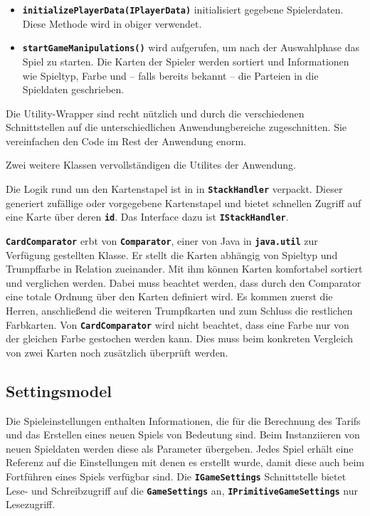 \documentclass[
							a4paper, 
							11pt, 
							openany, 
							liststotoc,
							parskip=half, 
   							headings=normal
						]{scrreprt}
\begin{document}
{\begin{itemize}
ini\-tia\-li\-siert die Spieldaten für das nächste Spiel. Die gegebene Spielerposition wird der erste Spieler des Spiels. Der optionale Parameter kann verwendet werden, um das Spiel mit einem vordefinierten Kartenstapel zu initialisieren. Ist dieser nicht gesetzt so wird ein neuer, gemischter Stapel verwendet.
	\item \textbf{\texttt{initializePlayerData(IPlayerData)}} initialisiert gegebene Spielerdaten. Diese Methode wird in obiger verwendet.
	\item \textbf{\texttt{startGameManipulations()}} wird aufgerufen, um nach der Auswahlphase das Spiel zu starten. Die Karten der Spieler werden sortiert und Informationen wie Spieltyp, Farbe und -- falls bereits bekannt -- die Parteien in die Spieldaten geschrieben.
\end{itemize}\bigskip

Die Utility-Wrapper sind recht nützlich und durch die verschiedenen Schnittstellen auf die unterschiedlichen Anwendungbereiche zugeschnitten. Sie vereinfachen den Code im Rest der Anwendung enorm.\bigskip

Zwei weitere Klassen vervollständigen die Utilites der Anwendung.

Die Logik rund um den Kartenstapel ist in in \textbf{\texttt{StackHandler}} verpackt. Dieser generiert zufällige oder vorgegebene Kartenstapel und bietet schnellen Zugriff auf eine Karte über deren \textbf{\texttt{id}}. Das Interface dazu ist \textbf{\texttt{IStackHandler}}.

\textbf{\texttt{CardComparator}} erbt von \textbf{\texttt{Comparator}}, einer von Java in \textbf{\texttt{java.util}} zur Verfügung gestellten Klasse. Er stellt die Karten abhängig von Spieltyp und Trumpffarbe in Relation zueinander. Mit ihm können Karten komfortabel sortiert und verglichen werden. Dabei muss beachtet werden, dass durch den Comparator eine totale Ordnung über den Karten definiert wird. Es kommen zuerst die Herren, anschließend die weiteren Trumpfkarten und zum Schluss die restlichen Farbkarten. Von \textbf{\texttt{CardComparator}} wird nicht beachtet, dass eine Farbe nur von der gleichen Farbe gestochen werden kann. Dies muss beim konkreten Vergleich von zwei Karten noch zusätzlich überprüft werden.

\clearpage

\subsection{Settingsmodel} \label{sse:anwendung_model_settings}
Die Spieleinstellungen enthalten Informationen, die für die Berechnung des Tarifs und das Erstellen eines neuen Spiels von Bedeutung sind. Beim Instanziieren von neuen Spieldaten werden diese als Parameter übergeben. Jedes Spiel erhält eine Referenz auf die Einstellungen mit denen es erstellt wurde, damit diese auch beim Fortführen eines Spiels verfügbar sind.
Die \textbf{\texttt{IGameSettings}} Schnittstelle bietet Lese- und Schreibzugriff auf die \textbf{\texttt{GameSettings}} an, \textbf{\texttt{IPrimitiveGameSettings}} nur Lesezugriff.

}
\end{document}
